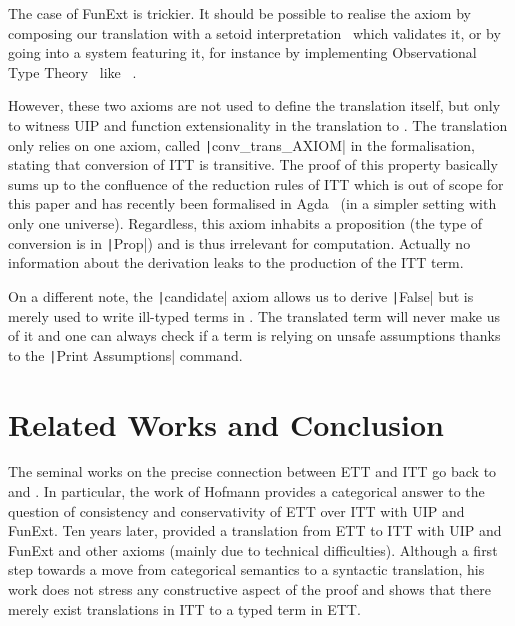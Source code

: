 The case of FunExt is trickier. It should be possible to realise
the axiom by composing our translation with a setoid
interpretation~ which validates it, or by going into a
system featuring it, for instance by implementing Observational Type
Theory~ like
\Epigram~.

However, these two axioms are not used to define the translation itself,
but only to witness UIP and function extensionality in the translation to
\Coq.
The translation only relies on one axiom, called
\texttt|conv_trans_AXIOM| in the formalisation, stating that conversion
of ITT is transitive.
%
The proof of this property basically sums up to the confluence of the
reduction rules of ITT which is out of scope for this paper and has
recently been formalised in Agda~ (in a
simpler setting with only one universe).
Regardless, this axiom inhabits a proposition (the type of conversion is in
\texttt|Prop|) and is thus irrelevant for computation. Actually no
information about the derivation leaks to the production of the ITT term.

On a different note, the \texttt|candidate| axiom allows us to derive
\texttt|False| but is merely used to write ill-typed terms in \Coq.
The translated term will never make us of it and one can always check if a
term is relying on unsafe assumptions thanks to the
\texttt|Print Assumptions| command.

\section{Related Works and Conclusion}
\label{sec:related-works}

The seminal works on the precise connection between ETT and ITT go
back to  and
.
%
In particular, the work of Hofmann provides a categorical answer to
the question of consistency and conservativity of ETT over ITT with
UIP and FunExt.
%
Ten years later,  provided
a translation from ETT to ITT with
UIP and FunExt and other axioms (mainly due to
technical difficulties).
%
Although a first step towards a move from categorical semantics to a
syntactic translation, his work does not stress any constructive
aspect of the proof and shows that there merely exist translations in
ITT to a typed term in ETT.

